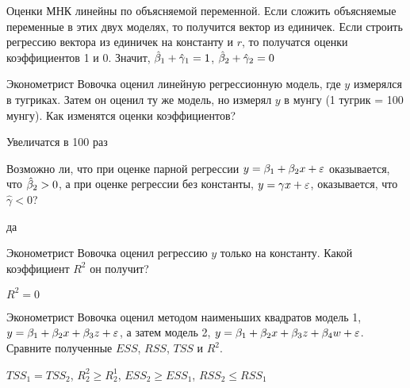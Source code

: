 \documentclass[pdftex,11pt,openany]{book}
\begin{document}
\begin{solution}
 Оценки МНК линейны по объясняемой переменной. Если сложить объясняемые переменные в этих двух моделях, то получится вектор из единичек. Если строить регрессию вектора из единичек на константу и $r$, то получатся оценки коэффициентов 1 и 0. Значит, $\hat{\beta}_1+\hat{\gamma}_1=1$, $\hat{\beta}_2+\hat{\gamma}_2=0$ 
\end{solution}



\begin{problem}
 Эконометрист Вовочка оценил линейную регрессионную модель, где $y$ измерялся в тугриках. Затем он оценил ту же модель, но измерял $y$ в мунгу (1 тугрик = 100 мунгу). Как изменятся оценки коэффициентов?
\end{problem}

\begin{solution}
 Увеличатся в 100 раз
\end{solution}


\begin{problem}
 Возможно ли, что при оценке парной регрессии $y=\beta_1+\beta_2 x+\varepsilon$ оказывается, что $\hat{\beta}_2>0$, а при оценке регрессии без константы, $y=\gamma x+\varepsilon$, оказывается, что $\hat{\gamma}<0$?
\end{problem}

\begin{solution}
 да
\end{solution}



\begin{problem}
 Эконометрист Вовочка оценил регрессию $y$ только на константу. Какой коэффициент $R^2$ он получит?
\end{problem}

\begin{solution}
$R^2=0$
\end{solution}



\begin{problem}
 Эконометрист Вовочка оценил методом наименьших квадратов модель 1, $y=\beta_1+\beta_2 x+\beta_3 z+\varepsilon$, а затем модель 2, $y=\beta_1+\beta_2 x+\beta_3 z+\beta_4 w+\varepsilon$. Сравните полученные $ESS$, $RSS$, $TSS$ и $R^2$.
\end{problem}

\begin{solution}
 $TSS_1=TSS_2$, $R_2^2\geq R_2^1$, $ESS_2\geq ESS_1$, $RSS_2\leq RSS_1$
\end{solution}
\end{document}
